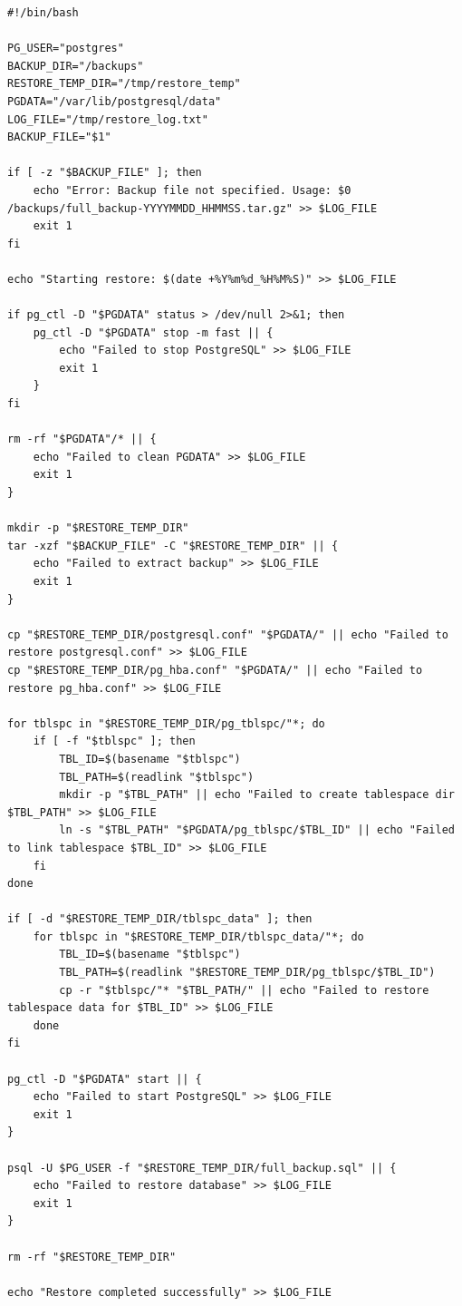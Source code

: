 \documentclass{article}
\begin{document}
\begin{lstlisting}[caption={kitty}, label={lst:example}]
#!/bin/bash

PG_USER="postgres"
BACKUP_DIR="/backups"
RESTORE_TEMP_DIR="/tmp/restore_temp"
PGDATA="/var/lib/postgresql/data"
LOG_FILE="/tmp/restore_log.txt"
BACKUP_FILE="$1"  

if [ -z "$BACKUP_FILE" ]; then
    echo "Error: Backup file not specified. Usage: $0 /backups/full_backup-YYYYMMDD_HHMMSS.tar.gz" >> $LOG_FILE
    exit 1
fi

echo "Starting restore: $(date +%Y%m%d_%H%M%S)" >> $LOG_FILE

if pg_ctl -D "$PGDATA" status > /dev/null 2>&1; then
    pg_ctl -D "$PGDATA" stop -m fast || {
        echo "Failed to stop PostgreSQL" >> $LOG_FILE
        exit 1
    }
fi

rm -rf "$PGDATA"/* || {
    echo "Failed to clean PGDATA" >> $LOG_FILE
    exit 1
}

mkdir -p "$RESTORE_TEMP_DIR"
tar -xzf "$BACKUP_FILE" -C "$RESTORE_TEMP_DIR" || {
    echo "Failed to extract backup" >> $LOG_FILE
    exit 1
}

cp "$RESTORE_TEMP_DIR/postgresql.conf" "$PGDATA/" || echo "Failed to restore postgresql.conf" >> $LOG_FILE
cp "$RESTORE_TEMP_DIR/pg_hba.conf" "$PGDATA/" || echo "Failed to restore pg_hba.conf" >> $LOG_FILE

for tblspc in "$RESTORE_TEMP_DIR/pg_tblspc/"*; do
    if [ -f "$tblspc" ]; then
        TBL_ID=$(basename "$tblspc")
        TBL_PATH=$(readlink "$tblspc")
        mkdir -p "$TBL_PATH" || echo "Failed to create tablespace dir $TBL_PATH" >> $LOG_FILE
        ln -s "$TBL_PATH" "$PGDATA/pg_tblspc/$TBL_ID" || echo "Failed to link tablespace $TBL_ID" >> $LOG_FILE
    fi
done

if [ -d "$RESTORE_TEMP_DIR/tblspc_data" ]; then
    for tblspc in "$RESTORE_TEMP_DIR/tblspc_data/"*; do
        TBL_ID=$(basename "$tblspc")
        TBL_PATH=$(readlink "$RESTORE_TEMP_DIR/pg_tblspc/$TBL_ID")
        cp -r "$tblspc/"* "$TBL_PATH/" || echo "Failed to restore tablespace data for $TBL_ID" >> $LOG_FILE
    done
fi

pg_ctl -D "$PGDATA" start || {
    echo "Failed to start PostgreSQL" >> $LOG_FILE
    exit 1
}

psql -U $PG_USER -f "$RESTORE_TEMP_DIR/full_backup.sql" || {
    echo "Failed to restore database" >> $LOG_FILE
    exit 1
}

rm -rf "$RESTORE_TEMP_DIR"

echo "Restore completed successfully" >> $LOG_FILE
\end{lstlisting}
\end{document}

